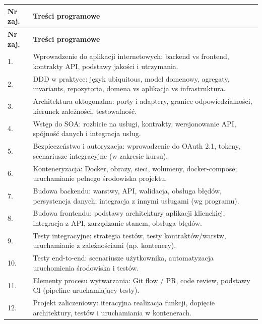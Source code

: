 \documentclass[12pt, a4paper]{article}
\newcommand{\thdrule}{\noalign{\global\setlength{\extrarowheight}{0pt}}}
\newcommand{\thdend}{\noalign{\global\setlength{\extrarowheight}{3pt}}}
\begin{document}
{\scriptsize
\begin{longtable}{m{1.5cm}m{14.5cm}}
\thdrule\toprule
\rowcolor{pjatkRed} {\color{white}\textbf{Nr zaj.}} & {\color{white}\textbf{Treści programowe}} \\
\midrule\thdend
\endfirsthead
\thdrule\toprule
\rowcolor{pjatkRed} {\color{white}\textbf{Nr zaj.}} & {\color{white}\textbf{Treści programowe}} \\
\midrule\thdend
\endhead
  \rowcolor{tableRowLight} 1. & Wprowadzenie do aplikacji internetowych: backend vs frontend, kontrakty API, podstawy jakości i utrzymania. \\
  \rowcolor{tableRowAlt} 2. & DDD w praktyce: język ubiquitous, model domenowy, agregaty, invariants, repozytoria, domena vs aplikacja vs infrastruktura. \\
  \rowcolor{tableRowLight} 3. & Architektura oktogonalna: porty i adaptery, granice odpowiedzialności, kierunek zależności, testowalność. \\
  \rowcolor{tableRowAlt} 4. & Wstęp do SOA: rozbicie na usługi, kontrakty, wersjonowanie API, spójność danych i integracja usług. \\
  \rowcolor{tableRowLight} 5. & Bezpieczeństwo i autoryzacja: wprowadzenie do OAuth 2.1, tokeny, scenariusze integracyjne (w zakresie kursu). \\
  \rowcolor{tableRowAlt} 6. & Konteneryzacja: Docker, obrazy, sieci, wolumeny, docker-compose; uruchamianie pełnego środowiska projektu. \\
  \rowcolor{tableRowLight} 7. & Budowa backendu: warstwy, API, walidacja, obsługa błędów, persystencja danych; integracja z innymi usługami (wg programu). \\
  \rowcolor{tableRowAlt} 8. & Budowa frontendu: podstawy architektury aplikacji klienckiej, integracja z API, zarządzanie stanem, obsługa błędów. \\
  \rowcolor{tableRowLight} 9. & Testy integracyjne: strategia testów, testy kontraktów/warstw, uruchamianie z zależnościami (np. kontenery). \\
  \rowcolor{tableRowAlt} 10. & Testy end-to-end: scenariusze użytkownika, automatyzacja uruchomienia środowiska i testów. \\
  \rowcolor{tableRowLight} 11. & Elementy procesu wytwarzania: Git flow / PR, code review, podstawy CI (pipeline uruchamiający testy). \\
  \rowcolor{tableRowAlt} 12. & Projekt zaliczeniowy: iteracyjna realizacja funkcji, dopięcie architektury, testów i uruchamiania w kontenerach. \\
\bottomrule
\end{longtable}}
\end{document}
